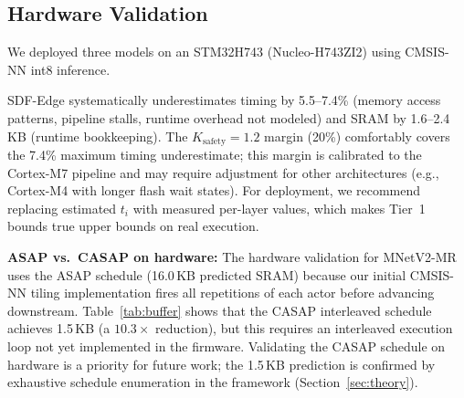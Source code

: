 \documentclass[journal]{IEEEtran}
\begin{document}
\subsection{Hardware Validation}
\label{sec:hw_validation}

We deployed three models on an STM32H743 (Nucleo-H743ZI2) using CMSIS-NN int8 inference.

\begin{table}[htbp]
\centering
\caption{SDF-Edge Predictions vs.\ On-Device Measurements (STM32H743, $n=50$)}
\label{tab:hw_validation}
\end{table}

SDF-Edge systematically underestimates timing by 5.5--7.4\% (memory access patterns, pipeline stalls, runtime overhead not modeled) and SRAM by 1.6--2.4\,KB (runtime bookkeeping).
The $K_{\mathrm{safety}} = 1.2$ margin (20\%) comfortably covers the 7.4\% maximum timing underestimate; this margin is calibrated to the Cortex-M7 pipeline and may require adjustment for other architectures (e.g., Cortex-M4 with longer flash wait states).
For deployment, we recommend replacing estimated $t_i$ with measured per-layer values, which makes Tier~1 bounds true upper bounds on real execution.

\textbf{ASAP vs.\ CASAP on hardware:}
The hardware validation for MNetV2-MR uses the ASAP schedule (16.0\,KB predicted SRAM) because our initial CMSIS-NN tiling implementation fires all repetitions of each actor before advancing downstream.
Table~\ref{tab:buffer} shows that the CASAP interleaved schedule achieves 1.5\,KB (a $10.3\times$ reduction), but this requires an interleaved execution loop not yet implemented in the firmware.
Validating the CASAP schedule on hardware is a priority for future work; the 1.5\,KB prediction is confirmed by exhaustive schedule enumeration in the framework (Section~\ref{sec:theory}).
\end{document}
